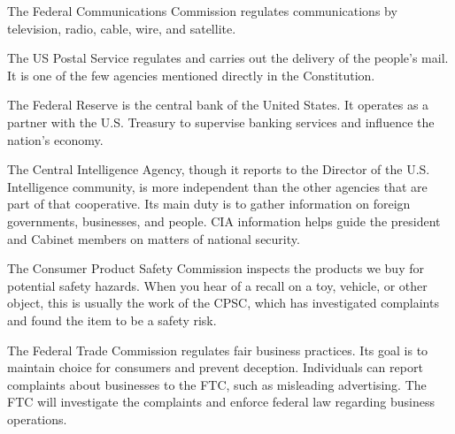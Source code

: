 \begin{definition}
    The Federal Communications Commission regulates communications by
    television, radio, cable, wire, and satellite.
\end{definition}

\begin{definition}
    The US Postal Service regulates and carries out the delivery of the people's
    mail. It is one of the few agencies mentioned directly in the Constitution.
\end{definition}

\begin{definition}
    The Federal Reserve is the central bank of the United States. It operates as
    a partner with the U.S. Treasury to supervise banking services and influence
    the nation's economy.
\end{definition}

\begin{definition}
    The Central Intelligence Agency, though it reports to the Director of the
    U.S. Intelligence community, is more independent than the other agencies
    that are part of that cooperative. Its main duty is to gather information on
    foreign governments, businesses, and people. CIA information helps guide the
    president and Cabinet members on matters of national security.
\end{definition}

\begin{definition}
    The Consumer Product Safety Commission inspects the products we buy for
    potential safety hazards. When you hear of a recall on a toy, vehicle, or
    other object, this is usually the work of the CPSC, which has investigated
    complaints and found the item to be a safety risk.
\end{definition}

\begin{definition}
    The Federal Trade Commission regulates fair business practices. Its goal is
    to maintain choice for consumers and prevent deception. Individuals can
    report complaints about businesses to the FTC, such as misleading
    advertising. The FTC will investigate the complaints and enforce federal law
    regarding business operations.
\end{definition}

